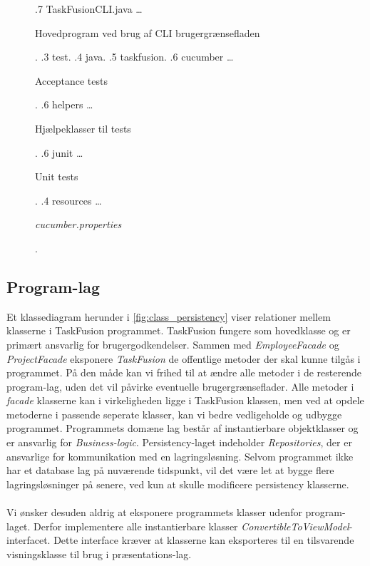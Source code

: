\begin{figure}[H]
{        .7 TaskFusionCLI.java \ldots{} \begin{minipage}[t]{5cm} Hovedprogram ved brug af CLI brugergrænsefladen \end{minipage}.
        .3 test.
        .4 java.
        .5 taskfusion.
        .6 cucumber \ldots{} \begin{minipage}[t]{5cm} Acceptance tests \end{minipage}.
        .6 helpers \ldots{} \begin{minipage}[t]{5cm} Hjælpeklasser til tests \end{minipage}.
        .6 junit \ldots{} \begin{minipage}[t]{5cm} Unit tests \end{minipage}.
        .4 resources \ldots{} \begin{minipage}[t]{5cm} \emph{cucumber.properties} \end{minipage}.
    }
\end{figure}

\subsection{Program-lag}
Et klassediagram herunder i \ref{fig:class_persistency} viser relationer mellem klasserne i TaskFusion programmet. TaskFusion fungere som hovedklasse og er primært ansvarlig for brugergodkendelser. Sammen med \textit{EmployeeFacade} og \textit{ProjectFacade} eksponere \textit{TaskFusion} de offentlige metoder der skal kunne tilgås i programmet. På den måde kan vi frihed til at ændre alle metoder i de resterende program-lag, uden det vil påvirke eventuelle brugergrænseflader. Alle metoder i \textit{facade} klasserne kan i virkeligheden ligge i TaskFusion klassen, men ved at opdele metoderne i passende seperate klasser, kan vi bedre vedligeholde og udbygge programmet. 
Programmets domæne lag består af instantierbare objektklasser og er ansvarlig for \textit{Business-logic}. Persistency-laget indeholder \textit{Repositories}, der er ansvarlige for kommunikation med en lagringsløsning. Selvom programmet ikke har et database lag på nuværende tidspunkt, vil det være let at bygge flere lagringsløsninger på senere, ved kun at skulle modificere persistency klasserne. 
\\ \\
Vi ønsker desuden aldrig at eksponere programmets klasser udenfor program-laget. Derfor implementere alle instantierbare klasser \textit{ConvertibleToViewModel}-interfacet. Dette interface kræver at klasserne kan eksporteres til en tilsvarende visningsklasse til brug i præsentations-lag. 

